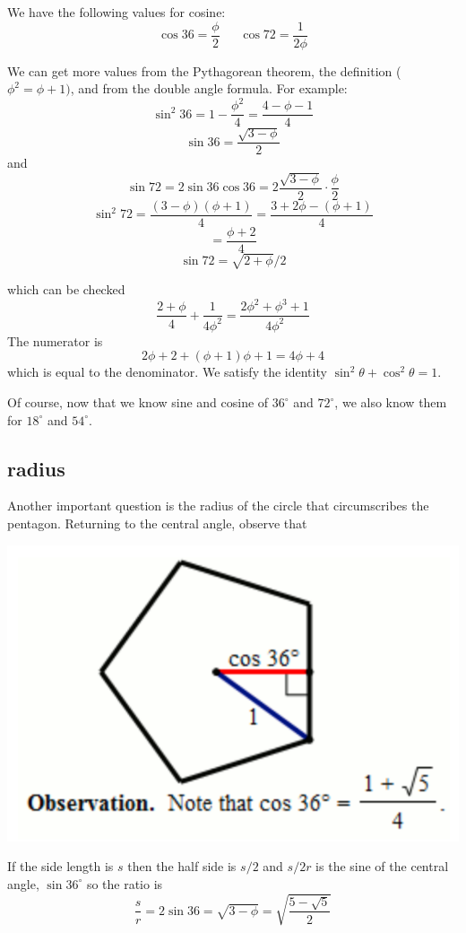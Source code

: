\documentclass[11pt, oneside]{article}
\begin{document}
We have the following values for cosine:
\[ \cos 36 = \frac{\phi}{2} \ \ \ \ \ \ \  \cos 72 = \frac{1}{2 \phi}  \]

We can get more values from the Pythagorean theorem, the definition ($\phi^2 = \phi + 1)$, and from the double angle formula.  For example:
\[ \sin^2 36 = 1 - \frac{\phi^2}{4}  = \frac{4 - \phi - 1}{4} \]
\[ \sin 36 = \frac{\sqrt{3 - \phi}}{2} \]
and
\[ \sin 72 = 2 \sin 36 \cos 36 =  2  \frac{\sqrt{3 - \phi}}{2} \cdot \frac{\phi}{2}  \]
\[ \sin^2 72 = \frac{(3-\phi)(\phi + 1)}{4} = \frac{3 + 2 \phi - (\phi + 1)}{4}\]
\[ = \frac{\phi + 2}{4} \]
\[ \sin 72 = \sqrt{2 + \phi}/2 \]

which can be checked
\[ \frac{2 + \phi}{4} + \frac{1}{4 \phi^2} = \frac{2 \phi^2 + \phi^3 + 1}{4 \phi^2} \]
The numerator is
\[ 2 \phi + 2 + (\phi + 1)\phi + 1 = 4 \phi + 4 \]
which is equal to the denominator.  We satisfy the identity $\sin^2 \theta + \cos^2 \theta = 1$.

Of course, now that we know sine and cosine of $36^\circ$ and $72^\circ$, we also know them for $18^\circ$ and $54^\circ$.

\subsection*{radius}

Another important question is the radius of the circle that circumscribes the pentagon.  Returning to the central angle, observe that

\begin{center} \includegraphics [scale=0.3] {cos36.png} \end{center}

If the side length is $s$ then the half side is $s/2$ and $s/2r$ is the sine of the central angle, $\sin 36^\circ$ so the ratio is
\[ \frac{s}{r} = 2 \sin 36 = \sqrt{3 - \phi} = \sqrt{\frac{5 - \sqrt{5}}{2}}  \]
\end{document}
